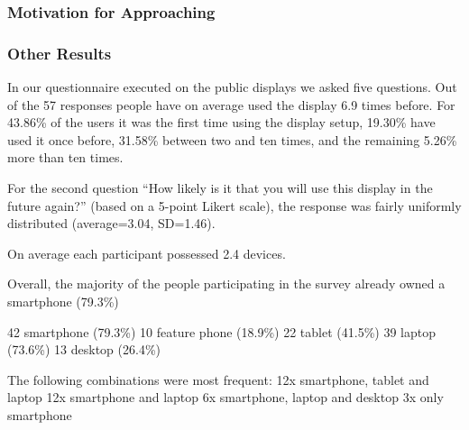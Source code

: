 	



	\subsubsection{Motivation for Approaching}





	\subsubsection{Other Results}

	In our questionnaire executed on the public displays we asked five questions. Out of the 57 responses people have on average used the display 6.9 times before. For 43.86\% of the users it was the first time using the display setup, 19.30\% have used it once before, 31.58\% between two and ten times, and the remaining 5.26\% more than ten times.

	For the second question ``How likely is it that you will use this display in the future again?'' (based on a 5-point Likert scale), the response was fairly uniformly distributed (average=3.04, SD=1.46).

	On average each participant possessed 2.4 devices. 

	Overall, the majority of the people participating in the survey already owned a smartphone (79.3\%)

		42	smartphone (79.3\%)
		10	feature phone (18.9\%)
		22	tablet (41.5\%)
		39	laptop (73.6\%)
		13	desktop (26.4\%)

	The following combinations were most frequent: 
		12x smartphone, tablet and laptop
		12x smartphone and laptop
		6x smartphone, laptop and desktop
		3x only smartphone

